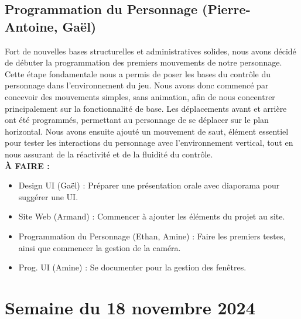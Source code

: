 \documentclass{report}
\begin{document}
\subsection*{Programmation du Personnage (Pierre-Antoine, Gaël)}
Fort de nouvelles bases structurelles et administratives solides, nous avons décidé de débuter la programmation des premiers mouvements de notre personnage. Cette étape fondamentale nous a permis de poser les bases du contrôle du personnage dans l'environnement du jeu. Nous avons donc commencé par concevoir des mouvements simples, sans animation, afin de nous concentrer principalement sur la fonctionnalité de base. Les déplacements avant et arrière ont été programmés, permettant au personnage de se déplacer sur le plan horizontal. Nous avons ensuite ajouté un mouvement de saut, élément essentiel pour tester les interactions du personnage avec l'environnement vertical, tout en nous assurant de la réactivité et de la fluidité du contrôle.
\\[1cm]
\textbf{À FAIRE :}
\begin{itemize}
    \item Design UI (Gaël) : Préparer une présentation orale avec diaporama pour suggérer une UI.
    \item Site Web (Armand) : Commencer à ajouter les éléments du projet au site.
    \item Programmation du Personnage (Ethan, Amine) : Faire les premiers testes, ainsi que commencer la gestion de la caméra.
    \item Prog. UI (Amine) : Se documenter pour la gestion des fenêtres.
\end{itemize}





\newpage
\section{Semaine du 18 novembre 2024}
\end{document}
